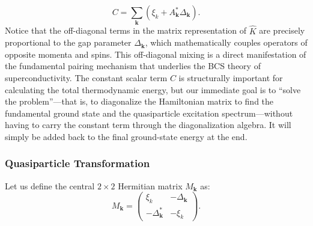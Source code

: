 \[
    C = \sum_{\mathbf{k}} \left( \xi_k + A_{\mathbf{k}}^* \Delta_{\mathbf{k}} \right).
\]
Notice that the off-diagonal terms in the matrix representation of \( \hat{K} \) are precisely proportional to the gap parameter \( \Delta_{\mathbf{k}} \), which mathematically couples operators of opposite momenta and spins. This off-diagonal mixing is a direct manifestation of the fundamental pairing mechanism that underlies the BCS theory of superconductivity. The constant scalar term \( C \) is structurally important for calculating the total thermodynamic energy, but our immediate goal is to ``solve the problem''—that is, to diagonalize the Hamiltonian matrix to find the fundamental ground state and the quasiparticle excitation spectrum—without having to carry the constant term through the diagonalization algebra. It will simply be added back to the final ground-state energy at the end.

\subsubsection{Quasiparticle Transformation}

Let us define the central \( 2 \times 2 \) Hermitian matrix \( M_{\mathbf{k}} \) as:
\[
    M_{\mathbf{k}} = \begin{pmatrix} \xi_k & -\Delta_{\mathbf{k}} \\ -\Delta_{\mathbf{k}}^* & -\xi_k \end{pmatrix}.
\]

